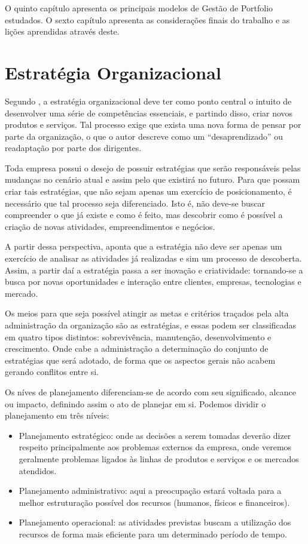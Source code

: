 \documentclass[12pt,a4paper,ruledheader,tocpage=prefix,floatnumber=continuous,pagestart=folhaderosto,font=times]{abnt}
\begin{document}
O quinto capítulo apresenta os principais modelos de Gestão de Portfolio estudados. O sexto capítulo apresenta as considerações finais do trabalho e as lições
aprendidas através deste.

\chapter{Estratégia Organizacional}
Segundo , a estratégia organizacional deve ter como ponto central o intuito de desenvolver uma série de competências essenciais, e partindo
disso, criar novos produtos e serviços. Tal processo exige que exista uma nova forma de pensar por parte da organização, o que o autor descreve como um
``desaprendizado'' ou readaptação por parte dos dirigentes. 

Toda empresa possui o desejo de possuir estratégias que serão responsáveis pelas mudanças no cenário atual e assim pelo que existirá no futuro. Para que possam
criar tais estratégias, que não sejam apenas um exercício de posicionamento, é necessário que tal processo seja diferenciado. Isto é, não deve-se buscar 
compreender o que já existe e como é feito, mas descobrir como é possível a criação de novas atividades, empreendimentos e negócios. 

A partir dessa perspectiva,  aponta que a estratégia não deve ser apenas um exercício de analisar as atividades já realizadas e sim um processo
de descoberta. Assim, a partir daí a estratégia passa a ser inovação e criatividade: tornando-se a busca por novas oportunidades e interação entre clientes, 
empresas, tecnologias e mercado.

Os meios para que seja possível atingir as metas e critérios traçados pela alta administração da organização são as estratégias, e essas
podem ser classificadas em quatro tipos distintos: sobrevivência, manutenção, desenvolvimento e crescimento. Onde cabe a administração a determinação do conjunto
de estratégias que será adotado, de forma que os aspectos gerais não acabem gerando conflitos entre si.

Os níves de planejamento diferenciam-se de acordo com seu significado, alcance ou impacto, definindo assim o ato de planejar em si. Podemos dividir o 
planejamento em três níveis\cite{SANVICENTE2000}:

\begin{itemize}
 \item Planejamento estratégico: onde as decisões a serem tomadas deverão dizer respeito principalmente aos problemas externos da empresa, onde veremos geralmente
       problemas ligados às linhas de produtos e serviços e os mercados atendidos.
 \item Planejamento administrativo: aqui a preocupação estará voltada para a melhor estruturação possível dos recursos (humanos, físicos e financeiros).
 \item Planejamento operacional: as atividades previstas buscam a utilização dos recursos de forma mais eficiente para um determinado período de tempo.
\end{itemize}
\end{document}
